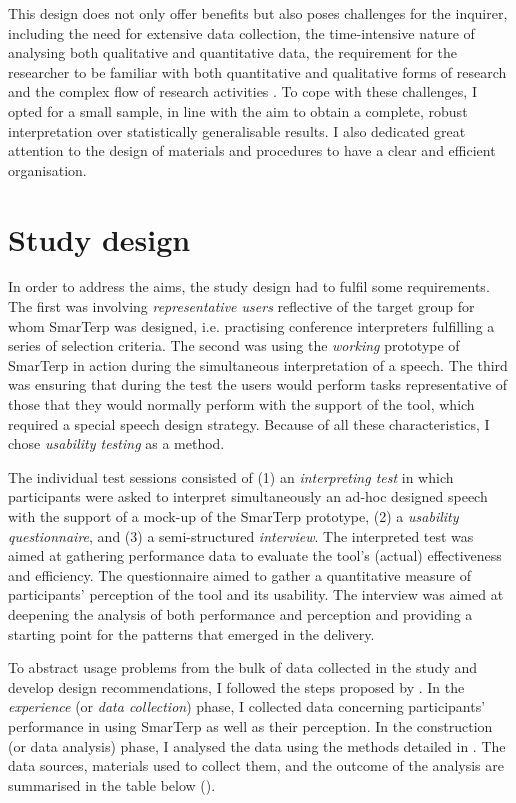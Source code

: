 This design does not only offer benefits but also poses challenges for the inquirer, including the need for extensive data collection, the time-intensive nature of analysing both qualitative and quantitative data, the requirement for the researcher to be familiar with both quantitative and qualitative forms of research and the complex flow of research activities \citep[298]{creswell2017research}. To cope with these challenges, I opted for a small sample, in line with the aim to obtain a complete, robust interpretation over statistically generalisable results. I also dedicated great attention to the design of materials and procedures to have a clear and efficient organisation.


\section{Study design}

In order to address the aims, the study design had to fulfil some requirements. The first was involving \textit{representative users} reflective of the target group for whom SmarTerp was designed, i.e. practising conference interpreters fulfilling a series of selection criteria. The second was using the \textit{working} prototype of SmarTerp in action during the simultaneous interpretation of a speech. The third was ensuring that during the test the users would perform tasks representative of those that they would normally perform with the support of the tool, which required a special speech design strategy. Because of all these characteristics, I chose \textit{usability testing} as a method.

The individual test sessions consisted of (1) an \textit{interpreting test} in which participants were asked to interpret simultaneously an ad-hoc designed speech with the support of a mock-up of the SmarTerp prototype, (2) a \textit{usability questionnaire}, and (3) a semi-structured \textit{interview}. The interpreted test was aimed at gathering performance data to evaluate the tool’s (actual) effectiveness and efficiency. The questionnaire aimed to gather a quantitative measure of participants’ perception of the tool and its usability. The interview was aimed at deepening the analysis of both performance and perception and providing a starting point for the patterns that emerged in the delivery.

To abstract usage problems from the bulk of data collected in the study and develop design recommendations, I followed the steps proposed by \citet{seewald2004kritischen}. In the \textit{experience} (or \textit{data collection}) phase, I collected data concerning participants’ performance in using SmarTerp as well as their perception. In the construction (or data analysis) phase, I analysed the data using the methods detailed in . The data sources, materials used to collect them, and the outcome of the analysis are summarised in the table below ().





